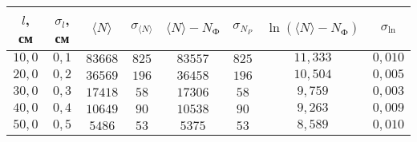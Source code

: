 \begin{tabular}{| c | c | c | c | c | c | c | c |}
\hline
$l$, см & $\sigma_l$, см & $\langle N \rangle$ & $\sigma_{\langle N \rangle}$ &
$\langle N \rangle-N_{\text{Ф}}$ & $\sigma_{N_P}$ & $\ln{(\langle N
\rangle-N_{\text{Ф}})}$ & $\sigma_{\ln}$\\
\hline
$10,0$ & $0,1$ & $83668$ & $825$ & $83557$ & $825$ & $11,333$ & $0,010$\\
\hline
$20,0$ & $0,2$ & $36569$ & $196$ & $36458$ & $196$ & $10,504$ & $0,005$\\
\hline
$30,0$ & $0,3$ & $17418$ & $58$ & $17306$ & $58$ & $9,759$ & $0,003$\\
\hline
$40,0$ & $0,4$ & $10649$ & $90$ & $10538$ & $90$ & $9,263$ & $0,009$\\
\hline
$50,0$ & $0,5$ & $5486$ & $53$ & $5375$ & $53$ & $8,589$ & $0,010$\\
\hline
\end{tabular}
